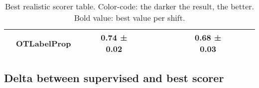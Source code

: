 \begin{table}[H]
\begin{tabular}{c|l|c|c|c|c|c|c|c|c|c|c|c|c|c|}
 & OTLabelProp & \cellcolor{red!25}{0.73 ± 0.02} & \cellcolor{red!20}{0.72 ± 0.02} & 0.74 ± 0.02 & \cellcolor{red!30}{0.68 ± 0.03} & \cellcolor{red!22}{0.72 ± 0.01} & \cellcolor{red!16}{0.74 ± 0.01} & \cellcolor{red!25}{0.66 ± 0.03} & \cellcolor{red!28}{0.67 ± 0.02} & \cellcolor{red!19}{0.78 ± 0.02} & 0.68 ± 0.03 & \cellcolor{red!21}{0.68 ± 0.01} & \cellcolor{red!18}{0.76 ± 0.02} & \cellcolor{red!23}{0.71 ± 0.04} \\
\hline
\end{tabular}
\caption{Best realistic scorer table. Color-code: the darker the result, the better. Bold value: best value per shift.}
\end{table}

\subsection{Delta between supervised and best scorer}

